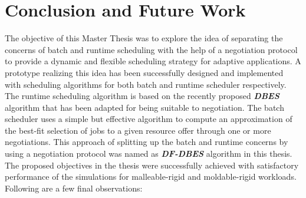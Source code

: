 \chapter{Conclusion and Future Work}\label{chapter:conclusion and future}
The objective of this Master Thesis was to explore the idea of separating the concerns of batch and runtime scheduling with the help of a negotiation protocol to provide a dynamic and flexible scheduling strategy for adaptive applications. A prototype realizing this idea has been successfully designed and implemented with scheduling algorithms for both batch and runtime scheduler respectively. The runtime scheduling algorithm is based on the recently proposed \textbf{\textit{DBES}} algorithm that has been adapted for being suitable to negotiation. The batch scheduler uses a simple but effective algorithm to compute an approximation of the best-fit selection of jobs to a given resource offer through one or more negotiations. This approach of splitting up the batch and runtime concerns by using a negotiation protocol was named as \textbf{\textit{DF-DBES}} algorithm in this thesis. The proposed objectives in the thesis were successfully achieved with satisfactory performance of the simulations for malleable-rigid and moldable-rigid workloads. Following are a few final observations:
